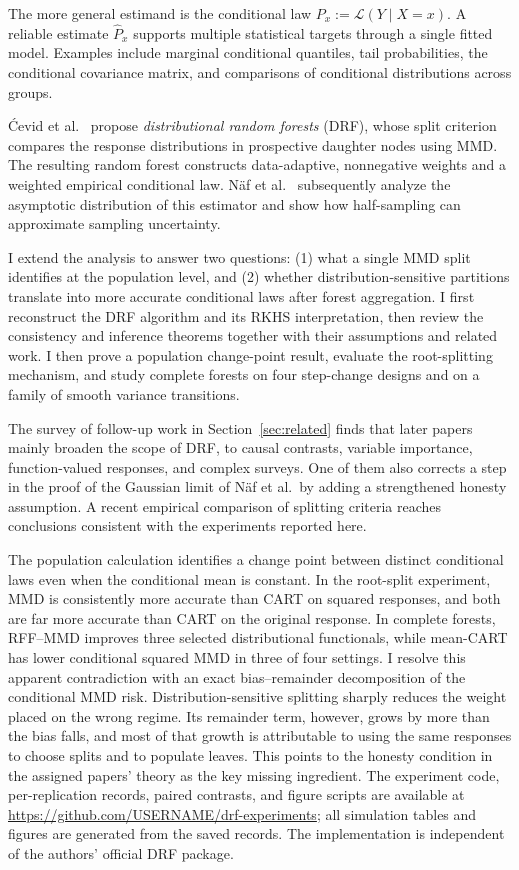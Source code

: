 \documentclass[12pt,a4paper]{article}
\newcommand{\1}{\mathbf 1}
\begin{document}
The more general estimand is the conditional law $P_x:=\mathcal L(Y\mid X=x)$. A reliable estimate $\widehat P_x$ supports multiple statistical targets through a single fitted model. Examples include marginal conditional quantiles, tail probabilities, the conditional covariance matrix, and comparisons of conditional distributions across groups.

\'{C}evid et al.\ \cite{cevid2022} propose \emph{distributional random forests} (DRF), whose split criterion compares the response distributions in prospective daughter nodes using MMD. The resulting random forest constructs data-adaptive, nonnegative weights and a weighted empirical conditional law. N\"af et al.\ \cite{naf2023} subsequently analyze the asymptotic distribution of this estimator and show how half-sampling can approximate sampling uncertainty.

I extend the analysis to answer two questions: (1) what a single MMD split identifies at the population level, and (2) whether distribution-sensitive partitions translate into more accurate conditional laws after forest aggregation. I first reconstruct the DRF algorithm and its RKHS interpretation, then review the consistency and inference theorems together with their assumptions and related work. I then prove a population change-point result, evaluate the root-splitting mechanism, and study complete forests on four step-change designs and on a family of smooth variance transitions.

The survey of follow-up work in Section~\ref{sec:related} finds that later papers mainly broaden the scope of DRF, to causal contrasts, variable importance, function-valued responses, and complex surveys. One of them also corrects a step in the proof of the Gaussian limit of N\"af et al.\ by adding a strengthened honesty assumption. A recent empirical comparison of splitting criteria reaches conclusions consistent with the experiments reported here.

The population calculation identifies a change point between distinct conditional laws even when the conditional mean is constant. In the root-split experiment, MMD is consistently more accurate than CART on squared responses, and both are far more accurate than CART on the original response. In complete forests, RFF--MMD improves three selected distributional functionals, while mean-CART has lower conditional squared MMD in three of four settings. I resolve this apparent contradiction with an exact bias--remainder decomposition of the conditional MMD risk. Distribution-sensitive splitting sharply reduces the weight placed on the wrong regime. Its remainder term, however, grows by more than the bias falls, and most of that growth is attributable to using the same responses to choose splits and to populate leaves. This points to the honesty condition in the assigned papers' theory as the key missing ingredient. The experiment code, per-replication records, paired contrasts, and figure scripts are available at \url{https://github.com/USERNAME/drf-experiments}; %
all simulation tables and figures are generated from the saved records. The implementation is independent of the authors' official DRF package.
\end{document}
